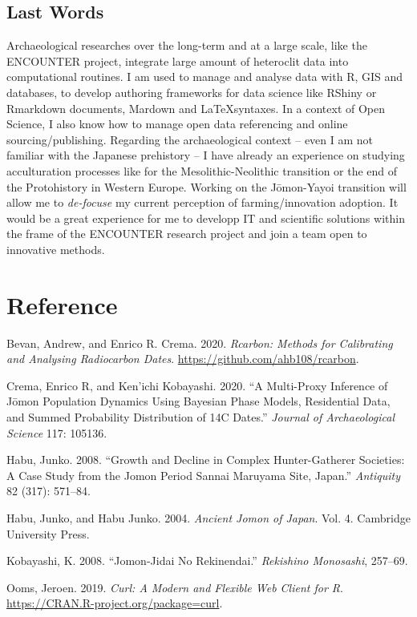 \documentclass[
]{article}
\begin{document}
\hypertarget{last-words}{%
\subsection{Last Words}\label{last-words}}

Archaeological researches over the long-term and at a large scale, like
the ENCOUNTER project, integrate large amount of heteroclit data into
computational routines. I am used to manage and analyse data with
\textsf{R}, GIS and databases, to develop authoring frameworks for data
science like RShiny or Rmarkdown documents, Mardown and \LaTeX syntaxes.
In a context of Open Science, I also know how to manage open data
referencing and online sourcing/publishing. Regarding the archaeological
context -- even I am not familiar with the Japanese prehistory -- I have
already an experience on studying acculturation processes like for the
Mesolithic-Neolithic transition or the end of the Protohistory in
Western Europe. Working on the Jōmon-Yayoi transition will allow me to
\emph{de-focuse} my current perception of farming/innovation adoption.
It would be a great experience for me to developp IT and scientific
solutions within the frame of the ENCOUNTER research project and join a
team open to innovative methods.

\hypertarget{reference}{%
\section*{Reference}\label{reference}}

\hypertarget{refs}{}
\leavevmode\hypertarget{ref-Bevan20}{}%
Bevan, Andrew, and Enrico R. Crema. 2020. \emph{Rcarbon: Methods for
Calibrating and Analysing Radiocarbon Dates}.
\url{https://github.com/ahb108/rcarbon}.

\leavevmode\hypertarget{ref-crema2020multi}{}%
Crema, Enrico R, and Ken'ichi Kobayashi. 2020. ``A Multi-Proxy Inference
of Jōmon Population Dynamics Using Bayesian Phase Models, Residential
Data, and Summed Probability Distribution of 14C Dates.'' \emph{Journal
of Archaeological Science} 117: 105136.

\leavevmode\hypertarget{ref-Habu08}{}%
Habu, Junko. 2008. ``Growth and Decline in Complex Hunter-Gatherer
Societies: A Case Study from the Jomon Period Sannai Maruyama Site,
Japan.'' \emph{Antiquity} 82 (317): 571--84.

\leavevmode\hypertarget{ref-habu2004ancient}{}%
Habu, Junko, and Habu Junko. 2004. \emph{Ancient Jomon of Japan}. Vol.
4. Cambridge University Press.

\leavevmode\hypertarget{ref-kobayashi2008jomon}{}%
Kobayashi, K. 2008. ``Jomon-Jidai No Rekinendai.'' \emph{Rekishino
Monosashi}, 257--69.

\leavevmode\hypertarget{ref-Ooms19}{}%
Ooms, Jeroen. 2019. \emph{Curl: A Modern and Flexible Web Client for R}.
\url{https://CRAN.R-project.org/package=curl}.
\end{document}
